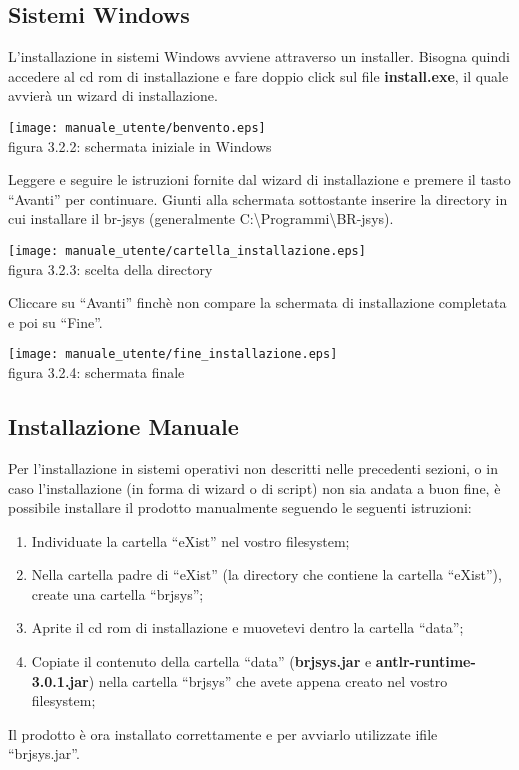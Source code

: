 \subsection{Sistemi Windows}
L'installazione in sistemi Windows avviene attraverso un installer. Bisogna quindi accedere al cd rom di installazione e fare doppio click sul file  \textbf{install.exe}, il quale avvier\`a un wizard di installazione.
\begin{center}
\texttt{[image: manuale\_utente/benvento.eps]}\\
 figura 3.2.2: schermata iniziale in Windows
\end{center}
Leggere e seguire le istruzioni fornite dal wizard di installazione e premere il tasto ``Avanti'' per continuare.
Giunti alla schermata sottostante inserire la directory in cui installare il br-jsys (generalmente C:\textbackslash Programmi\textbackslash BR-jsys).
\begin{center}
\texttt{[image: manuale\_utente/cartella\_installazione.eps]}\\
 figura 3.2.3: scelta della directory
\end{center}
Cliccare su ``Avanti'' finch\`e non compare la schermata di installazione completata e poi su ``Fine''.
\begin{center}
\texttt{[image: manuale\_utente/fine\_installazione.eps]}\\
figura 3.2.4: schermata finale
\end{center}

\subsection{Installazione Manuale}
Per l'installazione in sistemi operativi non descritti nelle precedenti sezioni, o in caso l'installazione (in forma di wizard o di script) non sia andata a buon fine, \`e possibile installare il prodotto manualmente seguendo le seguenti istruzioni:
\begin{enumerate}
\item Individuate la cartella ``eXist'' nel vostro filesystem;
\item Nella cartella padre di ``eXist'' (la directory che contiene la cartella ``eXist''), create una cartella ``brjsys'';
\item Aprite il cd rom di installazione e muovetevi dentro la cartella ``data'';
\item Copiate il contenuto della cartella ``data'' (\textbf{brjsys.jar} e \textbf{antlr-runtime-3.0.1.jar}) nella cartella ``brjsys'' che avete appena creato nel vostro filesystem;
\end{enumerate}
Il prodotto \`e ora installato correttamente e per avviarlo utilizzate ifile ``brjsys.jar''.


